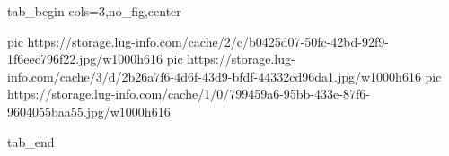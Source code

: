  
 
 
 
 


\ifcmt
  tab_begin cols=3,no_fig,center

     pic https://storage.lug-info.com/cache/2/c/b0425d07-50fc-42bd-92f9-1f6eec796f22.jpg/w1000h616
		 pic https://storage.lug-info.com/cache/3/d/2b26a7f6-4d6f-43d9-bfdf-44332cd96da1.jpg/w1000h616
		 pic https://storage.lug-info.com/cache/1/0/799459a6-95bb-433e-87f6-9604055baa55.jpg/w1000h616

  tab_end
\fi
